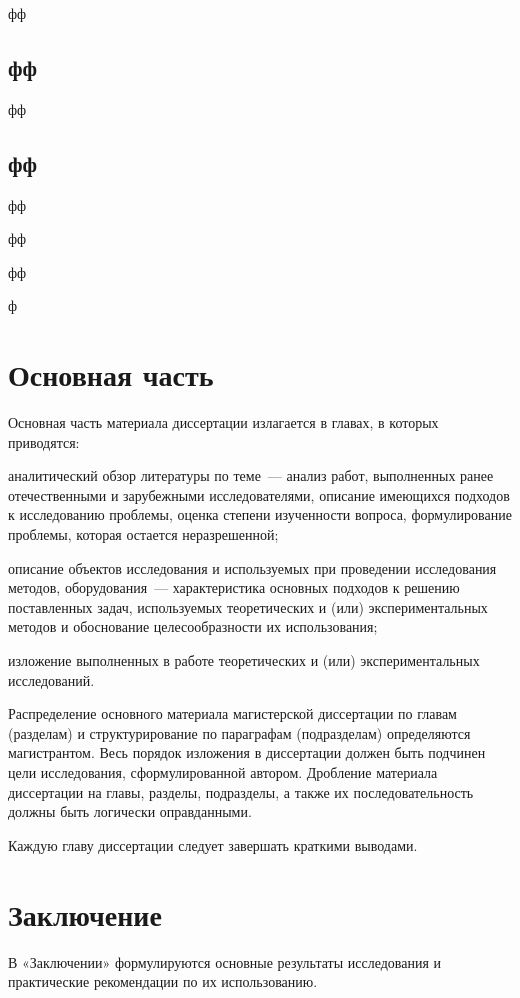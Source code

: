 \documentclass{mpaper}
\begin{document}
    фф

    \section{фф}

    фф

    \section{фф}

    фф

    фф

    фф

    ф

    \chapter{Основная часть}
    Основная часть материала диссертации излагается в главах, в которых приводятся:

    аналитический обзор литературы по теме~--– анализ работ, выполненных ранее отечественными и зарубежными исследователями, описание имеющихся подходов к исследованию проблемы, оценка степени изученности вопроса, формулирование проблемы, которая остается неразрешенной;

    описание объектов исследования и используемых при проведении исследования методов, оборудования~--– характеристика основных подходов к решению поставленных задач, используемых теоретических и (или) экспериментальных методов и обоснование целесообразности их использования;

    изложение выполненных в работе теоретических и (или) экспериментальных исследований.

    Распределение основного материала магистерской диссертации по главам (разделам) и структурирование по параграфам (подразделам) определяются магистрантом. Весь порядок изложения в диссертации должен быть подчинен цели исследования, сформулированной автором. Дробление материала диссертации на главы, разделы, подразделы, а также их
    последовательность должны быть логически оправданными.

    Каждую главу диссертации следует завершать краткими выводами.
    \chapter*{Заключение}
    В «Заключении» формулируются основные результаты исследования и практические рекомендации по их использованию.
\end{document}
